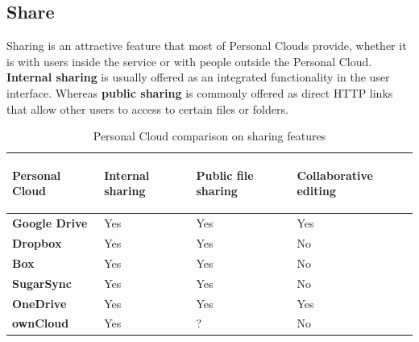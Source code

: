\subsection{Share}


Sharing is an attractive feature that most of Personal Clouds provide, whether it is with users inside the service or with people outside the Personal Cloud. \textbf{Internal sharing} is usually offered as an integrated functionality in the user interface. Whereas \textbf{public sharing} is commonly offered as direct HTTP links that allow other users to access to certain files or folders.


{
\def\arraystretch{1.5}

\begin{table}
\begin{center}
    \begin{tabular}{ | p{3.3cm} | p{1.5cm} | p{1.5cm} | p{1.5cm} | }
    \hline
    \rowcolor[gray]{0.8}

	\textbf{Personal Cloud} &
	\begin{sideways}\textbf{Internal sharing}\end{sideways} &
	\begin{sideways}\textbf{Public file sharing}\end{sideways} &
	\begin{sideways}\textbf{Collaborative editing}\end{sideways} \\ \hline

	\textbf{Google Drive} &
	Yes &
	Yes &
	Yes \\ \hline

	\textbf{Dropbox} &
	Yes &
	Yes &
	No \\ \hline
	
	\textbf{Box} &
	Yes &
	Yes &
	No \\ \hline
	
	\textbf{SugarSync} & 
	Yes &
	Yes &
	No \\ \hline
	
	\textbf{OneDrive} & 
	Yes &
	Yes &
	Yes \\ \hline
	
	\textbf{ownCloud} &
	Yes &
	? &
	No \\ \hline

    \end{tabular}
    \caption{Personal Cloud comparison on sharing features}
    \label{tab:pc_sharing}
\end{center}
\end{table}
}

